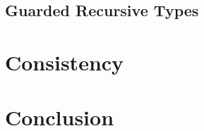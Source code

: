 \documentclass[a4paper,UKenglish,cleveref, autoref,numberwithinsect]{lipics-v2019}
\begin{document}
\subsection{Guarded Recursive Types}


\section{Consistency}


\section{Conclusion}




\end{document}
